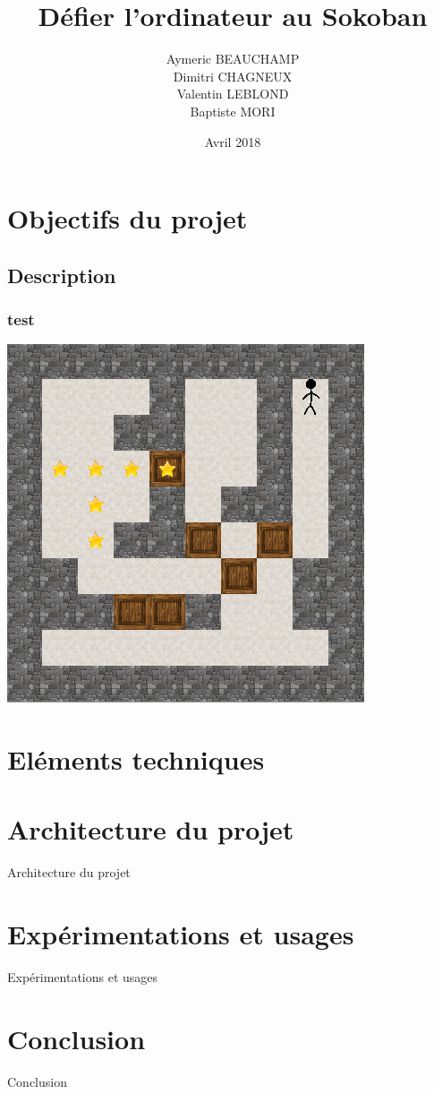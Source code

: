 \documentclass{beamer}
\title{Défier l'ordinateur au Sokoban}
\author{Aymeric BEAUCHAMP\\Dimitri CHAGNEUX\\Valentin LEBLOND\\Baptiste MORI}
\date{Avril 2018}
\begin{document}
 
\maketitle 

\frame{\tableofcontents}

\section{Objectifs du projet}
\subsection{Description}
\begin{frame} %
\frametitle{test}
\includegraphics[scale=0.3]{images/sokoban.png}
\end{frame}

\section{Eléments techniques}

\begin{frame}

\end{frame}

\begin{frame}

\end{frame}

\section{Architecture du projet}
\begin{frame}
Architecture du projet
\end{frame}
\section{Expérimentations et usages}
\begin{frame}
Expérimentations et usages
\end{frame}
\section{Conclusion}
\begin{frame}
Conclusion
\end{frame}
\end{document}
